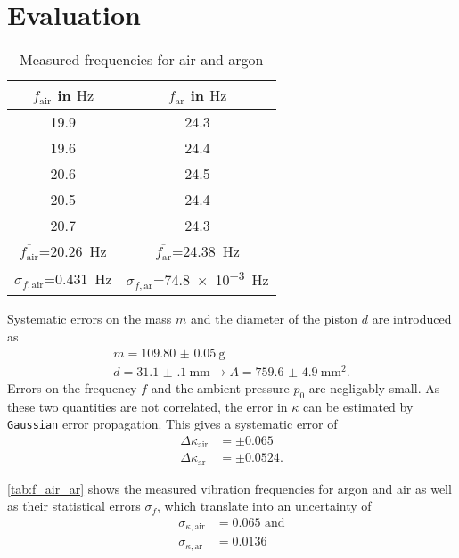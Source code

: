 \section{Evaluation}
\begin{table}[b!]
	\centering
	\caption{Measured frequencies for air and argon}
	\label{tab:f_air_ar}
	\begin{tabular}{SS}
		\toprule
		{$f_\text{air}$ in $\si{\hertz}$}	&	{{$f_\text{ar}$ in $\si{\hertz}$}}\\
		\midrule
		\num{19.9}	&	\num{24.3}	\\
		\num{19.6}	&	\num{24.4}	\\
		\num{20.6}	&	\num{24.5}	\\
		\num{20.5}	&	\num{24.4}	\\
		\num{20.7}	&	\num{24.3}	\\
		\midrule
		{$\overline{f_\text{air}}$=\SI{20.26}{\hertz}}	&	{$\overline{f_\text{ar}}$=\SI{24.38}{\hertz}}	\\
		{$\sigma_{f,\text{air}}$=\SI{0.431}{\hertz}}	&	{$\sigma_{f,\text{ar}}$=\SI{74.8e-3}{\hertz}}	\\
		\bottomrule
	\end{tabular}
\end{table}

Systematic errors on the mass $m$ and the diameter of the piston $d$ are introduced as
\begin{gather*}
	m=\SI{109.80(5)}{\gram} \\
	d=\SI{31.1(1)}{\milli\meter}\rightarrow A=\SI{759.6(49)}{\milli\meter\squared}.
\end{gather*}
Errors on the frequency $f$ and the ambient pressure $p_0$ are negligably small.
As these two quantities are not correlated, the error in $\kappa$ can be estimated by \texttt{Gaussian} error propagation.
This gives a systematic error of
\begin{align*}
	\Delta\kappa_\text{air}&=\pm\num{0.065}	\\
	\Delta\kappa_\text{ar}&=\pm\num{0.0524}.
\end{align*}

\autoref{tab:f_air_ar} shows the measured vibration frequencies for argon and air as well as their statistical errors $\sigma_f$, which translate into an uncertainty of
\begin{align*}
	\sigma_{\kappa,\text{air}}&=\num{0.065}\text{ and}	\\
	\sigma_{\kappa,\text{ar}}&=\num{0.0136}
\end{align*}

